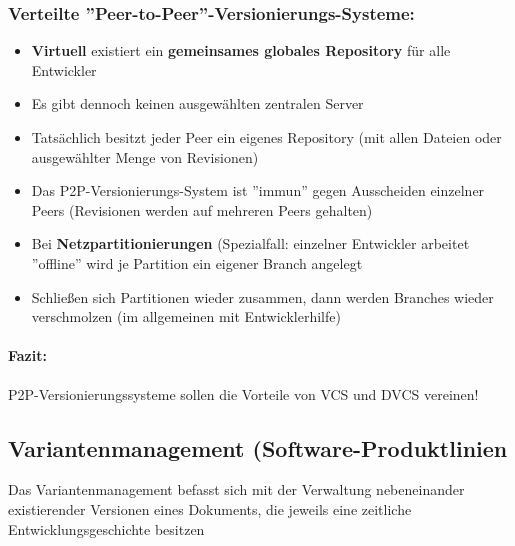 \subsubsection{Verteilte ''Peer-to-Peer''-Versionierungs-Systeme:}
\begin{itemize}
	\item \textbf{Virtuell} existiert ein \textbf{gemeinsames globales Repository} für alle Entwickler
	\item Es gibt dennoch keinen ausgewählten zentralen Server
	\item Tatsächlich besitzt jeder Peer ein eigenes Repository (mit allen Dateien oder ausgewählter Menge von Revisionen)
	\item Das P2P-Versionierungs-System ist ''immun'' gegen Ausscheiden einzelner Peers (Revisionen werden auf mehreren Peers gehalten)
	\item Bei \textbf{Netzpartitionierungen} (Spezialfall: einzelner Entwickler arbeitet ''offline'' wird je Partition ein eigener Branch angelegt
	\item Schließen sich Partitionen wieder zusammen, dann werden Branches wieder verschmolzen (im allgemeinen mit Entwicklerhilfe)
\end{itemize}
\paragraph{Fazit:}
P2P-Versionierungssysteme sollen die Vorteile von VCS und DVCS vereinen!
\subsection{Variantenmanagement (Software-Produktlinien}
Das Variantenmanagement befasst sich mit der Verwaltung nebeneinander existierender Versionen eines Dokuments, die jeweils eine zeitliche Entwicklungsgeschichte besitzen
